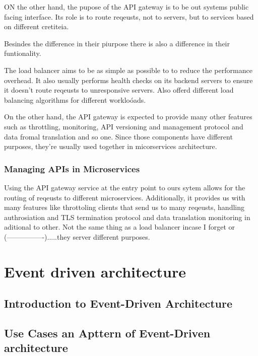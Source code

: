 \documentclass[a4paper, 11pt]{book}
\begin{document}
{    ON the other hand, the pupose of the API gateway is to be out systems public facing interface.
    Its role is to route reqeusts, not to servers, but to services based on different cretiteia.

    Besindes the difference in their piurpose there is also a difference in their funtionality.

    The load balancer aims to be as simple as possible to to reduce the performance overhead.
    It also usually performs health checks on its backend servers to ensure it doesn't route reqeusts to unresponsive servers.
    Also offerd different load balancing algorithms for different workloóads.

    On the other hand, the API gateway is expected to provide many other features such as throttling, monitoring, API versioning and management protocol and data fromal translation and so one.
    Since those components have different purposes, they're usually used together in micorservices architecture.

    \subsubsection{Managing APIs in Microservices}
    Using the API gateway service at the entry point to ours sytem allows for the routing of reqeusts to different microservices.
    Additionally, it provides us with many features like throttoling clients that send us to many reqeusts, handling authrosiation and TLS termination protocol and data translation monitoring in aditional to other.
    Not the same thing as a load balancer incase I forget or (----------------).....they server different purposes.


    \section{Event driven architecture}

    \subsection{Introduction to Event-Driven Architecture}

    \subsection{Use Cases an Apttern of Event-Driven architecture}

}
\end{document}
